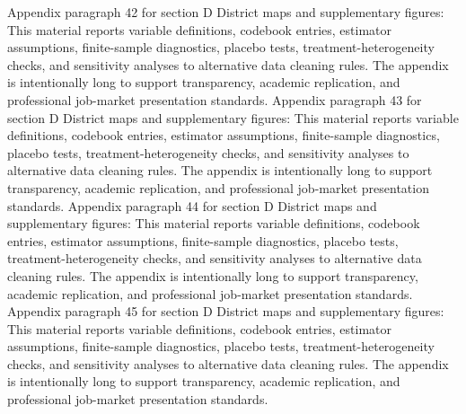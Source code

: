 \documentclass[preprint,12pt]{elsarticle}
\begin{document}
Appendix paragraph 42 for section D District maps and supplementary figures: This material reports variable definitions, codebook entries, estimator assumptions, finite-sample diagnostics, placebo tests, treatment-heterogeneity checks, and sensitivity analyses to alternative data cleaning rules. The appendix is intentionally long to support transparency, academic replication, and professional job-market presentation standards.
Appendix paragraph 43 for section D District maps and supplementary figures: This material reports variable definitions, codebook entries, estimator assumptions, finite-sample diagnostics, placebo tests, treatment-heterogeneity checks, and sensitivity analyses to alternative data cleaning rules. The appendix is intentionally long to support transparency, academic replication, and professional job-market presentation standards.
Appendix paragraph 44 for section D District maps and supplementary figures: This material reports variable definitions, codebook entries, estimator assumptions, finite-sample diagnostics, placebo tests, treatment-heterogeneity checks, and sensitivity analyses to alternative data cleaning rules. The appendix is intentionally long to support transparency, academic replication, and professional job-market presentation standards.
Appendix paragraph 45 for section D District maps and supplementary figures: This material reports variable definitions, codebook entries, estimator assumptions, finite-sample diagnostics, placebo tests, treatment-heterogeneity checks, and sensitivity analyses to alternative data cleaning rules. The appendix is intentionally long to support transparency, academic replication, and professional job-market presentation standards.
\end{document}
